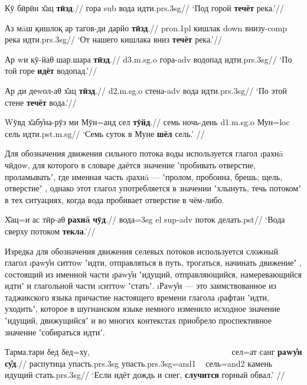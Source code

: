 \begingl
\gla Кӯ бӣрӣн х̌ац \textbf{тӣзд}.//
\glc гора {\sc sub} вода идти.{\sc prs.3sg}//
\glft ‘Под горой \textbf{течёт} река.’//
\endgl \xe

\begingl
\gla Аз мāш қишлоқ ар тагов-ди дарйо \textbf{тӣзд}.//
 {\sc pron.1pl} кишлак {\sc down} внизу-{\sc comp} река идти.{\sc prs.3sg}//
\glft ‘От нашего кишлака вниз \textbf{течёт} река.’//
\endgl \xe

\begingl
\gla Ар wи кӯ-йаθ шар.шара \textbf{тӣзд}.//
 {\sc d3.m.sg.o} гора-{\sc adv} водопад идти.{\sc prs.3sg}//
\glft ‘По той горе \textbf{идёт} водопад.’//
\endgl \xe

\begingl
\gla Ар ди деwол-аθ х̌ац \textbf{тӣзд}.//
 {\sc d2.m.sg.o} стена-{\sc adv} вода идти.{\sc prs.3sg}//
\glft ‘По этой стене \textbf{течёт} вода.’//
\endgl \xe

\begingl
\gla Wӯвд х̌абу̊на-рӯз ми Мӯн=анд сел \textbf{тӯйд}.//
\glc семь ночь-день {\sc d1.m.sg.o} Мун={\sc loc} сель идти.{\sc pst.m.sg}//
\glft ‘Семь суток в Муне \textbf{шёл} сель.’ //
\endgl \xe

Для обозначения движения сильного потока воды используется глагол \i{рахнā чӣдоw}, для которого в словаре даётся значение ʽпробивать отверстие, проламыватьʼ, где именная часть \i{рахнā} — ʽпролом, пробоина, брешь; щель, отверстиеʼ \parencite[479]{karamshoev1991}, однако этот глагол употребляется в значении ʽхлынуть, течь потокомʼ в тех ситуациях, когда вода пробивает отверстие в чём-либо.

\begingl
\gla Х̌ац=и ас тӣр-аθ \textbf{рахнā} \textbf{чӯд}.//
\glc вода={\sc 3sg} {\sc el} {\sc sup-adv} поток делать.{\sc pst}//
\glft ‘Вода сверху потоком \textbf{текла}.’//
\endgl \xe

Изредка для обозначения движения селевых потоков используется сложный глагол \i{раwу̊н ситтоw} ʽидти, отправляться в путь, трогаться, начинать движениеʼ \parencite[472–473]{karamshoev1991}, состоящий из именной части \i{раwу̊н} ʽидущий, отправляющийся, намеревающийся идтиʼ и глагольной части \i{ситтоw} ʽстатьʼ. \i{Раwу̊н} — это заимствованное из таджикского языка причастие настоящего времени глагола \i{рафтан} ʽидти, уходитьʼ, которое в шугнанском языке немного изменило исходное значение ʽидущий, движущийсяʼ и во многих контекстах приобрело проспективное значение ʽсобираться идтиʼ.

\begingl
\gla Тарма.тари δед δед=ху, ~~~~~~~~~~~~~~~~~~~~~~~~~~~~~~~~~ сел=ат санг \textbf{раwу̊н} \textbf{су̊д}.//
\glc распутица упасть.{\sc prs.3sg} упасть.{\sc prs.3sg=and1} ~ сель={\sc and2} камень идущий стать.{\sc prs.3sg}//
\glft ‘Если идёт дождь и снег, \textbf{случится} горный обвал.’ //
\endgl \xe

